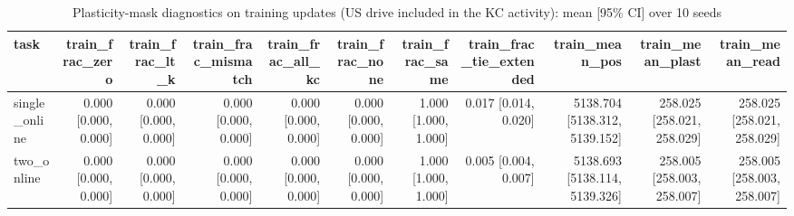 \begin{table}[t]
\centering
\small
\begin{tabular}{lrrrrrrrrrr}
\toprule
task & train\_frac\_zero & train\_frac\_lt\_k & train\_frac\_mismatch & train\_frac\_all\_kc & train\_frac\_none & train\_frac\_same & train\_frac\_tie\_extended & train\_mean\_pos & train\_mean\_plast & train\_mean\_read \\
\midrule
single\_online & 0.000 [0.000, 0.000] & 0.000 [0.000, 0.000] & 0.000 [0.000, 0.000] & 0.000 [0.000, 0.000] & 0.000 [0.000, 0.000] & 1.000 [1.000, 1.000] & 0.017 [0.014, 0.020] & 5138.704 [5138.312, 5139.152] & 258.025 [258.021, 258.029] & 258.025 [258.021, 258.029] \\
two\_online & 0.000 [0.000, 0.000] & 0.000 [0.000, 0.000] & 0.000 [0.000, 0.000] & 0.000 [0.000, 0.000] & 0.000 [0.000, 0.000] & 1.000 [1.000, 1.000] & 0.005 [0.004, 0.007] & 5138.693 [5138.114, 5139.326] & 258.005 [258.003, 258.007] & 258.005 [258.003, 258.007] \\
\bottomrule
\end{tabular}
\caption{Plasticity-mask diagnostics on training updates (US drive included in the KC activity): mean [95\% CI] over 10 seeds}
\label{tab:kc_diag_freq_train}
\end{table}